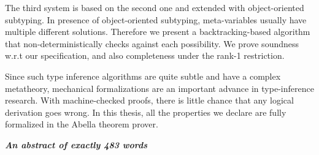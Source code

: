 The third system is based on the second one and extended with object-oriented subtyping.
In presence of object-oriented subtyping,
meta-variables usually have multiple different solutions.
Therefore we present a backtracking-based algorithm that
non-deterministically checks against each possibility.
We prove soundness w.r.t our specification,
and also completeness under the rank-1 restriction.

Since such type inference algorithms are quite subtle and have a complex metatheory,
mechanical formalizations are an important advance in type-inference research.
With machine-checked proofs, there is little chance that any logical derivation goes wrong.
In this thesis, all the properties we declare are fully formalized in the Abella theorem prover.



\vspace{1.5\baselineskip}

\noindent\makebox[\linewidth]{\rule{0.7\textwidth}{0.4pt}}

\begin{center}
    \emph{\textbf{An abstract of exactly 483 words}}
\end{center}


